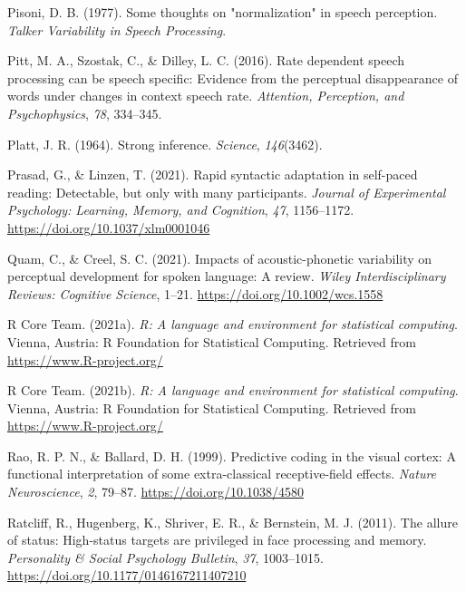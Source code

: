 \documentclass[
  11pt,
  english,
  man,floatsintext]{apa6}
\newlength{\cslhangindent}
\newlength{\cslentryspacingunit} %
\newenvironment{CSLReferences}[2] %
 {%
  \setlength{\parindent}{0pt}
  \ifodd #1
  \let\oldpar\par
  \def\par{\hangindent=\cslhangindent\oldpar}
  \fi
  \setlength{\parskip}{#2\cslentryspacingunit}
 }%
 {}
\begin{document}
\begin{CSLReferences}{1}{0}
\leavevmode{}%
Pisoni, D. B. (1977). Some thoughts on "normalization" in speech perception. \emph{Talker Variability in Speech Processing}.

\leavevmode{}%
Pitt, M. A., Szostak, C., \& Dilley, L. C. (2016). Rate dependent speech processing can be speech specific: Evidence from the perceptual disappearance of words under changes in context speech rate. \emph{Attention, Perception, and Psychophysics}, \emph{78}, 334--345.

\leavevmode{}%
Platt, J. R. (1964). Strong inference. \emph{Science}, \emph{146}(3462).

\leavevmode{}%
Prasad, G., \& Linzen, T. (2021). Rapid syntactic adaptation in self-paced reading: Detectable, but only with many participants. \emph{Journal of Experimental Psychology: Learning, Memory, and Cognition}, \emph{47}, 1156--1172. \url{https://doi.org/10.1037/xlm0001046}

\leavevmode{}%
Quam, C., \& Creel, S. C. (2021). Impacts of acoustic-phonetic variability on perceptual development for spoken language: A review. \emph{Wiley Interdisciplinary Reviews: Cognitive Science}, 1--21. \url{https://doi.org/10.1002/wcs.1558}

\leavevmode{}%
R Core Team. (2021a). \emph{R: A language and environment for statistical computing}. Vienna, Austria: R Foundation for Statistical Computing. Retrieved from \url{https://www.R-project.org/}

\leavevmode{}%
R Core Team. (2021b). \emph{R: A language and environment for statistical computing}. Vienna, Austria: R Foundation for Statistical Computing. Retrieved from \url{https://www.R-project.org/}

\leavevmode{}%
Rao, R. P. N., \& Ballard, D. H. (1999). Predictive coding in the visual cortex: A functional interpretation of some extra-classical receptive-field effects. \emph{Nature Neuroscience}, \emph{2}, 79--87. \url{https://doi.org/10.1038/4580}

\leavevmode{}%
Ratcliff, R., Hugenberg, K., Shriver, E. R., \& Bernstein, M. J. (2011). The allure of status: High-status targets are privileged in face processing and memory. \emph{Personality \& Social Psychology Bulletin}, \emph{37}, 1003--1015. \url{https://doi.org/10.1177/0146167211407210}


\end{CSLReferences}
\end{document}
